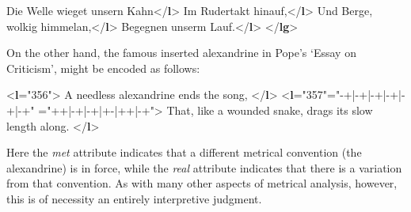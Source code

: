 \begin{shaded}
 Die Welle wieget unsern Kahn{</\textbf{l}>}\mbox{}\newline 
{} Im Rudertakt hinauf,{</\textbf{l}>}\mbox{}\newline 
{} Und Berge, wolkig himmelan,{</\textbf{l}>}\mbox{}\newline 
{} Begegnen unserm Lauf.{</\textbf{l}>}\mbox{}\newline 
{</\textbf{lg}>}\end{shaded}\egroup\par \noindent  On the other hand, the famous inserted alexandrine in Pope's ‘Essay on Criticism’, might be encoded as follows: \par\bgroup{}\exampleFont \begin{shaded}\noindent\mbox{}{<\textbf{l}\hspace*{1em}{n}="{356}">} A\mbox{}\newline 
 needless alexandrine ends the song, {</\textbf{l}>}\mbox{}\newline 
{<\textbf{l}\hspace*{1em}{n}="{357}"\hspace*{1em}{met}="{-+|-+|-+|-+|-+|-+}"\mbox{}\newline 
\hspace*{1em}{real}="{++|-+|-+|+-|++|-+}">} That, like a wounded\mbox{}\newline 
 snake, drags its slow length along. {</\textbf{l}>}\end{shaded}\egroup\par \noindent    Here the {\itshape met} attribute indicates that a different metrical convention (the alexandrine) is in force, while the {\itshape real} attribute indicates that there is a variation from that convention. As with many other aspects of metrical analysis, however, this is of necessity an entirely interpretive judgment.
